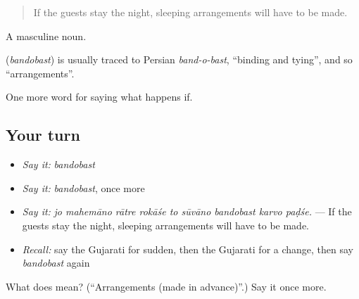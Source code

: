 \begin{quote}
If the guests stay the night, sleeping arrangements will have to be made.
\end{quote}

A masculine noun.

\begin{cousinweb}
\textbf{} (\emph{bandobast}) is usually traced to Persian \emph{band-o-bast}, \textquotedblleft{}binding and tying\textquotedblright{}, and so \textquotedblleft{}arrangements\textquotedblright{}.
\end{cousinweb}

\begin{grammarlens}[title={What you've built}]
One more word for saying what happens if.
\end{grammarlens}

\subsection*{Your turn}
\begin{itemize}
\raggedright
  \item \emph{Say it:} \emph{bandobast}
  \item \emph{Say it:} \emph{bandobast}, once more
  \item \emph{Say it:} \emph{jo mahemāno rātre rokāśe to sūvāno bandobast karvo paḍśe.} — If the guests stay the night, sleeping arrangements will have to be made.
  \item \emph{Recall:} say the Gujarati for sudden, then the Gujarati for a change, then say \emph{bandobast} again
\end{itemize}

\begin{tcolorbox}[breakable,colback=teal!4,colframe=teal!35!black,title={Before you move on}]
What does  mean? (\textquotedblleft{}Arrangements (made in advance)\textquotedblright{}.) Say it once more.
\end{tcolorbox}
